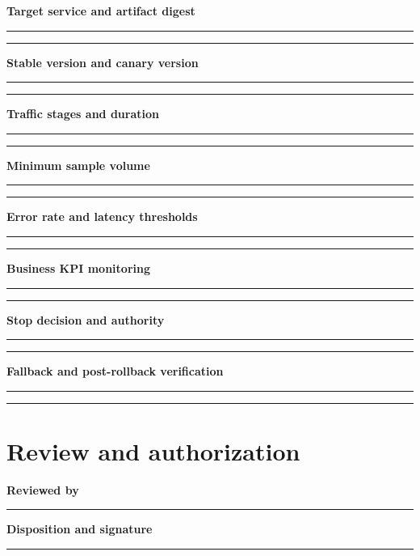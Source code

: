 \documentclass[10pt,letterpaper]{article}
\begin{document}
\textbf{Target service and artifact digest}\par
\noindent\rule{\linewidth}{0.35pt}\par\vspace{0.7em}
\noindent\rule{\linewidth}{0.35pt}\par\vspace{0.7em}
\textbf{Stable version and canary version}\par
\noindent\rule{\linewidth}{0.35pt}\par\vspace{0.7em}
\noindent\rule{\linewidth}{0.35pt}\par\vspace{0.7em}
\textbf{Traffic stages and duration}\par
\noindent\rule{\linewidth}{0.35pt}\par\vspace{0.7em}
\noindent\rule{\linewidth}{0.35pt}\par\vspace{0.7em}
\textbf{Minimum sample volume}\par
\noindent\rule{\linewidth}{0.35pt}\par\vspace{0.7em}
\noindent\rule{\linewidth}{0.35pt}\par\vspace{0.7em}
\textbf{Error rate and latency thresholds}\par
\noindent\rule{\linewidth}{0.35pt}\par\vspace{0.7em}
\noindent\rule{\linewidth}{0.35pt}\par\vspace{0.7em}
\textbf{Business KPI monitoring}\par
\noindent\rule{\linewidth}{0.35pt}\par\vspace{0.7em}
\noindent\rule{\linewidth}{0.35pt}\par\vspace{0.7em}
\textbf{Stop decision and authority}\par
\noindent\rule{\linewidth}{0.35pt}\par\vspace{0.7em}
\noindent\rule{\linewidth}{0.35pt}\par\vspace{0.7em}
\textbf{Fallback and post-rollback verification}\par
\noindent\rule{\linewidth}{0.35pt}\par\vspace{0.7em}
\noindent\rule{\linewidth}{0.35pt}\par\vspace{0.7em}
\section{Review and authorization}
\textbf{Reviewed by}\par
\noindent\rule{\linewidth}{0.35pt}\par\vspace{0.7em}
\textbf{Disposition and signature}\par
\noindent\rule{\linewidth}{0.35pt}\par\vspace{0.7em}
\end{document}
